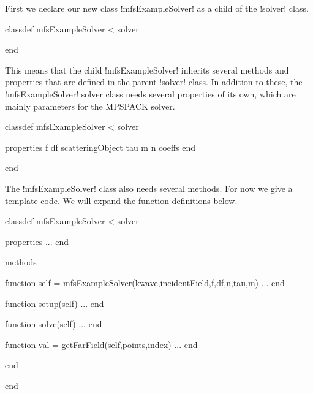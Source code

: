 \documentclass[12pt,letterpaper,final]{article}
\begin{document}
First we declare our new class !mfsExampleSolver! as a child of the
!solver! class. 
\begin{matlab}
classdef mfsExampleSolver < solver


end
\end{matlab}
This means that the child !mfsExampleSolver! inherits several methods and 
properties
that are defined in the parent !solver! class.
In addition to these, the !mfsExampleSolver! solver class needs several
properties of its own, which are mainly parameters for the MPSPACK solver.
\begin{matlab}
classdef mfsExampleSolver < solver

    properties
        f
        df
        scatteringObject
        tau
        m
        n
        coeffs
    end
    

end
\end{matlab}
The !mfsExampleSolver! class also needs several methods.
For now we give a template code. We will expand the function definitions below.
\begin{matlab}
classdef mfsExampleSolver < solver

    properties
       ...
    end
    
    methods

        function self = mfsExampleSolver(kwave,incidentField,f,df,n,tau,m)
            ...
        end

        function setup(self)
            ...
        end

        function solve(self)
            ...
        end

        function val = getFarField(self,points,index)
            ...
        end

    end

end
\end{matlab}
\end{document}
